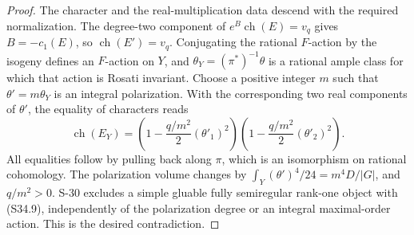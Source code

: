 \begin{proof}
The character and the real-multiplication data descend
with the required normalization. The degree-two component
of $e^B\operatorname{ch}(E)=v_q$ gives $B=-c_1(E)$,
so $\operatorname{ch}(E')=v_q$.
Conjugating the rational $F$-action by the isogeny
defines an $F$-action on $Y$, and
$\theta_Y=(\pi^*)^{-1}\theta$ is a rational ample class
for which that action is Rosati invariant. Choose a
positive integer $m$ such that $\theta'=m\theta_Y$
is an integral polarization. With the corresponding
two real components of $\theta'$, the equality of
characters reads
\[
 \operatorname{ch}(E_Y)
   =\left(1-\frac{q/m^2}{2}(\theta'_1)^2\right)
      \left(1-\frac{q/m^2}{2}(\theta'_2)^2\right).
 \tag{S34.9}
\]
All equalities follow by pulling back along $\pi$,
which is an isomorphism on rational cohomology. The
polarization volume changes by
$\int_Y(\theta')^4/24=m^4D/|G|$, and $q/m^2>0$.
S-30 excludes a simple gluable fully semiregular
rank-one object with (S34.9), independently of the
polarization degree or an integral maximal-order action.
This is the desired contradiction.
\end{proof}
